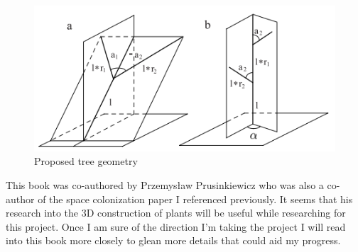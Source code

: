 \documentclass[proposal]{cmpreport}
\begin{document}
\begin{figure}[h]
        \caption{Proposed tree geometry}
        \includegraphics{MDbranches}
        \centering
\end{figure}

This book was co-authored by Przemysław Prusinkiewicz who was also a co-author of the 
space colonization paper I referenced previously. It seems that his research into 
the 3D construction of plants will be useful while researching for this project. 
Once I am sure of the direction I'm taking the project I will read into this book more 
closely to glean more details that could aid my progress.

\pagebreak

\end{document}
